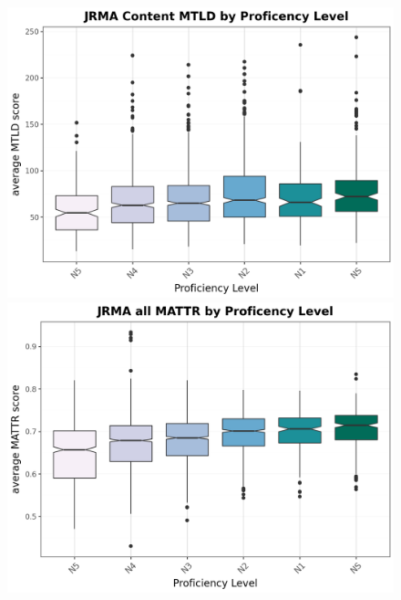 \begin{figure}[htbp]
    \centering
    \begin{minipage}{.48\textwidth}
        \centering
    \includegraphics[scale=.4]{img/JMRA-MTLDcontent}
    \caption[MTLD Content]{}
        \label{fig:MTLDcontent}
    \end{minipage}
    \hfill
\begin{minipage}{.48\textwidth}
        \centering
        \includegraphics[scale=.4]{img/JMRA-MATTRall}
        \caption[MATTR all]{}
\label{fig:MATTRall}
\end{minipage}
    \end{figure}



